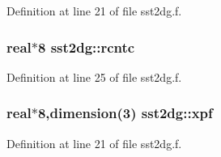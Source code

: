 Definition at line 21 of file sst2dg.f.\hypertarget{namespacesst2dg_87457152e8dd71203a0bfb7a6ee0ce7a}{
\subsubsection[rcntc]{\setlength{\rightskip}{0pt plus 5cm}real$\ast$8 {\bf sst2dg::rcntc}}}
\label{namespacesst2dg_87457152e8dd71203a0bfb7a6ee0ce7a}




Definition at line 25 of file sst2dg.f.\hypertarget{namespacesst2dg_29432778288d94db8d33519f10679b1f}{
\subsubsection[xpf]{\setlength{\rightskip}{0pt plus 5cm}real$\ast$8,dimension(3) {\bf sst2dg::xpf}}}
\label{namespacesst2dg_29432778288d94db8d33519f10679b1f}




Definition at line 21 of file sst2dg.f.